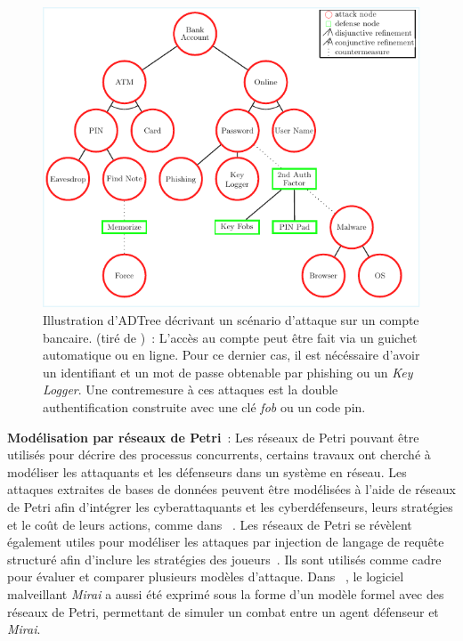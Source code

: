 \begin{figure}[h]
  \centering
  \includegraphics[width=\linewidth]{figures/adt.pdf}
  \caption[Illustration d'ADTree d'un scénario d'attaque sur un compte bancaire.]{Illustration d'ADTree décrivant un scénario d'attaque sur un compte bancaire. (tiré de \cite{BKordy2010})~: L'accès au compte peut être fait via un guichet automatique ou en ligne. Pour ce dernier cas, il est nécéssaire d'avoir un identifiant et un mot de passe obtenable par phishing ou un \textit{Key Logger}. Une contremesure à ces attaques est la double authentification construite avec une clé \textit{fob} ou un code pin.}
  \label{fig:bank_attack_defense_tree}
\end{figure}


\noindent
\textbf{Modélisation par réseaux de Petri}~: \quad Les réseaux de Petri pouvant être utilisés pour décrire des processus concurrents, certains travaux ont cherché à modéliser les attaquants et les défenseurs dans un système en réseau.
Les attaques extraites de bases de données peuvent être modélisées à l'aide de réseaux de Petri afin d'intégrer les cyberattaquants et les cyberdéfenseurs, leurs stratégies et le coût de leurs actions, comme dans ~\cite{MPetty2022}. Les réseaux de Petri se révèlent également utiles pour modéliser les attaques par injection de langage de requête structuré afin d'inclure les stratégies des joueurs~\cite{JBland2020}.
Ils sont utilisés comme cadre pour évaluer et comparer plusieurs modèles d'attaque.
Dans ~\cite{SYamaguchi2020}, le logiciel malveillant \textit{Mirai} a aussi été exprimé sous la forme d'un modèle formel avec des réseaux de Petri, permettant de simuler un combat entre un agent défenseur et \textit{Mirai}.

